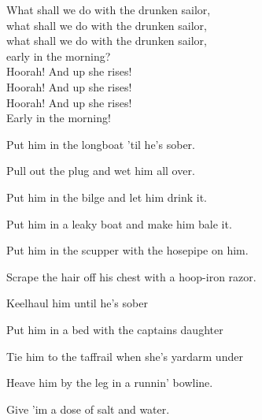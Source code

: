 \vspace{10pt}
What shall we do with the drunken sailor,\\
what shall we do with the drunken sailor,\\
what shall we do with the drunken sailor,\\
early in the morning?\\
Hoorah! And up she rises!\\
Hoorah! And up she rises!\\
Hoorah! And up she rises!\\
Early in the morning!\par
\vspace{10pt}
Put him in the longboat 'til he's sober.\par
\vspace{10pt}
Pull out the plug and wet him all over.\par
\vspace{10pt}
Put him in the bilge and let him drink it.\par
\vspace{10pt}
Put him in a leaky boat and make him bale it.\par
\vspace{10pt}
Put him in the scupper with the hosepipe on him.\par
\vspace{10pt}
Scrape the hair off his chest with a hoop-iron razor.\par
\vspace{10pt}
Keelhaul him until he's sober\par
\vspace{10pt}
Put him in a bed with the captains daughter\par
\vspace{10pt}
Tie him to the taffrail when she's yardarm under\par
\vspace{10pt}
Heave him by the leg in a runnin' bowline.\par
\vspace{10pt}
Give 'im a dose of salt and water.
